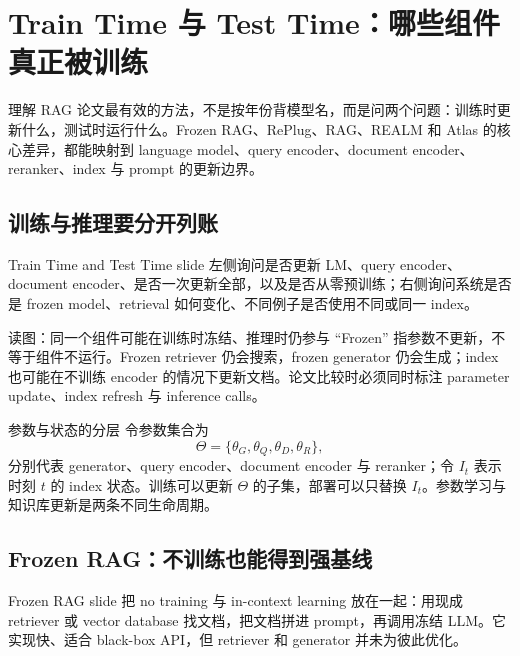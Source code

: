 \section{Train Time 与 Test Time：哪些组件真正被训练}

理解 RAG 论文最有效的方法，不是按年份背模型名，而是问两个问题：训练时更新什么，测试时运行什么。Frozen RAG、RePlug、RAG、REALM 和 Atlas 的核心差异，都能映射到 language model、query encoder、document encoder、reranker、index 与 prompt 的更新边界。

\subsection{训练与推理要分开列账}

Train Time and Test Time slide 左侧询问是否更新 LM、query encoder、document encoder、是否一次更新全部，以及是否从零预训练；右侧询问系统是否是 frozen model、retrieval 如何变化、不同例子是否使用不同或同一 index。


\begin{knowledgebox}{读图：同一个组件可能在训练时冻结、推理时仍参与}
``Frozen'' 指参数不更新，不等于组件不运行。Frozen retriever 仍会搜索，frozen generator 仍会生成；index 也可能在不训练 encoder 的情况下更新文档。论文比较时必须同时标注 parameter update、index refresh 与 inference calls。
\end{knowledgebox}

\begin{importantbox}{参数与状态的分层}
令参数集合为
\[
\Theta=\{\theta_G,\theta_Q,\theta_D,\theta_R\},
\]
分别代表 generator、query encoder、document encoder 与 reranker；令 $I_t$ 表示时刻 $t$ 的 index 状态。训练可以更新 $\Theta$ 的子集，部署可以只替换 $I_t$。参数学习与知识库更新是两条不同生命周期。
\end{importantbox}

\subsection{Frozen RAG：不训练也能得到强基线}

Frozen RAG slide 把 no training 与 in-context learning 放在一起：用现成 retriever 或 vector database 找文档，把文档拼进 prompt，再调用冻结 LLM。它实现快、适合 black-box API，但 retriever 和 generator 并未为彼此优化。


